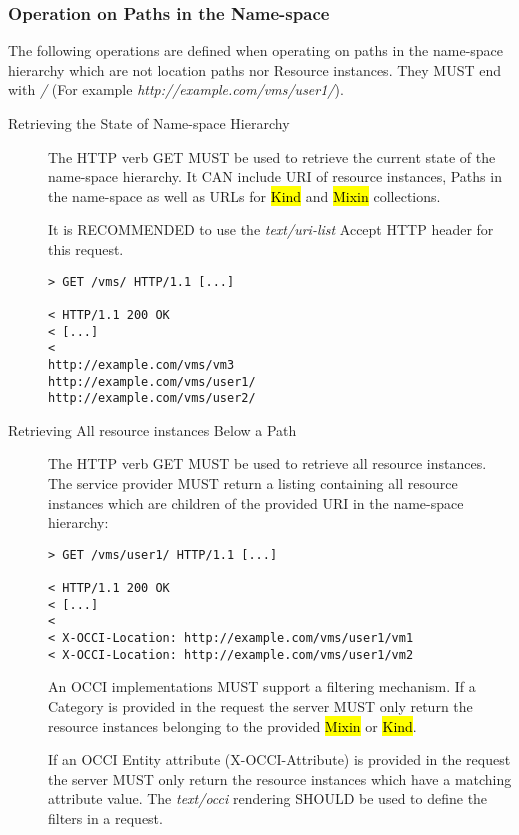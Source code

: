 \documentclass[10pt,a4paper]{article}
\begin{document}
\subsubsection{Operation on Paths in the Name-space}

The following operations are defined when operating on paths in the
name-space hierarchy which are not location paths nor Resource
instances. They MUST end with \emph{/} (For example
\emph{http://example.com/vms/user1/}).

\begin{description}

   \item[Retrieving the State of Name-space Hierarchy] The HTTP verb
     GET MUST be used to retrieve the current state of the name-space
     hierarchy. It CAN include URI of resource instances, Paths in the
     name-space as well as URLs for \hl{Kind} and \hl{Mixin}
     collections.

   It is RECOMMENDED to use the \emph{text/uri-list} Accept HTTP
   header for this request.

\begin{verbatim}
> GET /vms/ HTTP/1.1 [...]
 
< HTTP/1.1 200 OK
< [...]
< 
http://example.com/vms/vm3
http://example.com/vms/user1/
http://example.com/vms/user2/
\end{verbatim}

  \item[Retrieving All resource instances Below a Path] The HTTP verb
    GET MUST be used to retrieve all resource instances. The service
    provider MUST return a listing containing all resource instances
    which are children of the provided URI in the name-space
    hierarchy:

\begin{verbatim}
> GET /vms/user1/ HTTP/1.1 [...]
 
< HTTP/1.1 200 OK
< [...]
< 
< X-OCCI-Location: http://example.com/vms/user1/vm1
< X-OCCI-Location: http://example.com/vms/user1/vm2
\end{verbatim}

    An OCCI implementations MUST support a filtering mechanism. If a
    Category is provided in the request the server MUST only return
    the resource instances belonging to the provided \hl{Mixin} or
    \hl{Kind}.

    If an OCCI Entity attribute (X-OCCI-Attribute) is provided in the
    request the server MUST only return the resource instances which
    have a matching attribute value. The \emph{text/occi} rendering
    SHOULD be used to define the filters in a request.


\end{description}
\end{document}
